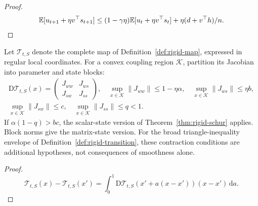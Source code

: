 \begin{proof}
\begin{gather}
 \mathbb E[u_{t+1}+\eta v^\top s_{t+1}]
 \le(1-\gamma\eta)\mathbb E[u_t+\eta v^\top s_t]
                                      +\eta(d+v^\top h)/n.
\end{gather}
\end{proof}
\begin{proposition}\label{prop:rigid-jacobian}
Let $\mathcal T_{t,S}$ denote the complete map of
Definition~\ref{def:rigid-map}, expressed in regular local coordinates. For a convex
coupling region $\mathcal K$, partition its Jacobian into parameter and state blocks:
\begin{gather}
 \mathrm D\mathcal T_{t,S}(x)=
 \begin{pmatrix}J_{ww}&J_{ws}\\J_{sw}&J_{ss}\end{pmatrix},\quad
 \sup_{x\in\mathcal K}\|J_{ww}\|\le1-\eta\alpha,\quad
 \sup_{x\in\mathcal K}\|J_{ws}\|\le\eta b,\\
 \sup_{x\in\mathcal K}\|J_{sw}\|\le c,\quad
 \sup_{x\in\mathcal K}\|J_{ss}\|\le q<1.
\end{gather}
If $\alpha(1-q)>bc$, the scalar-state version of
Theorem~\ref{thm:rigid-schur} applies. Block norms give the matrix-state version.
For the broad triangle-inequality envelope of
Definition~\ref{def:rigid-transition}, these contraction conditions are additional
hypotheses, not consequences of smoothness alone.
\end{proposition}
\begin{proof}
\begin{equation}
 \mathcal T_{t,S}(x)-\mathcal T_{t,S}(x')
 =\int_0^1\mathrm D\mathcal T_{t,S}(x'+a(x-x'))(x-x')\,\mathrm da.
\end{equation}
\end{proof}
